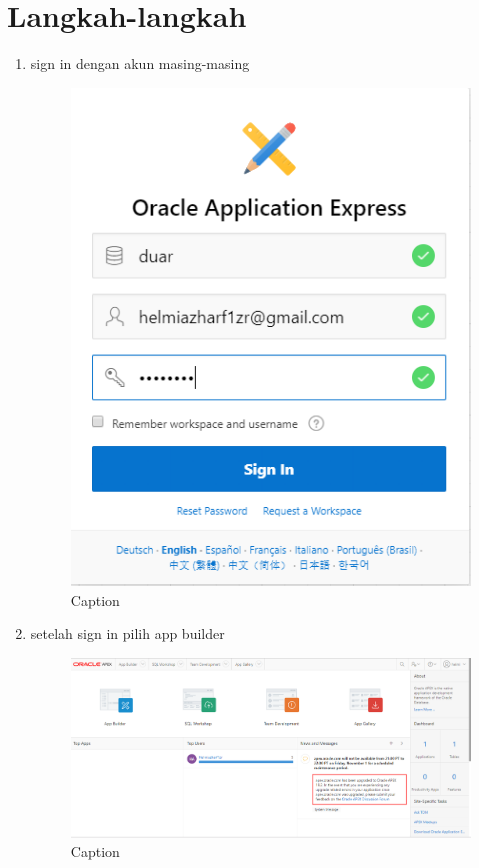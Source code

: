 ﻿\documentclass{article}
\begin{document}
\section{Langkah-langkah}
\begin{enumerate}
    \item sign in dengan akun masing-masing
    \begin{figure}
        \centering
        \includegraphics[scale=0.27]{gambar/1.PNG}
        \caption{Caption}
        \label{fig:my_label}
    \end{figure}

    \item setelah sign in pilih app builder
    \begin{figure}
        \centering
        \includegraphics[scale=0.35]{gambar/2.PNG}
        \caption{Caption}
        \label{fig:my_label}
    \end{figure}


\end{enumerate}
\end{document}
